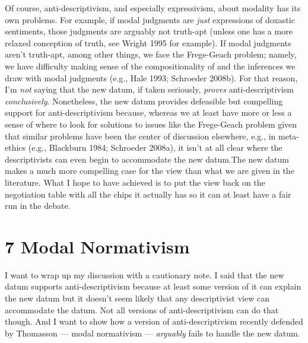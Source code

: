 \documentclass[a4paper,12pt]{article}
\begin{document}
Of course, anti-descriptivism, and especially expressivism, about modality has its own problems. For example, if modal judgments are \emph{just} expressions of doxastic sentiments, those judgments are arguably not truth-apt (unless one has a more relaxed conception of truth, see Wright 1995 for example). If modal judgments aren't truth-apt, among other things, we face the Frege-Geach problem; namely, we have difficulty making sense of the compositionality of and the inferences we draw with modal judgments (e.g., Hale 1993; Schroeder 2008b). For that reason, I'm \emph{not} saying that the new datum, if taken seriously, \emph{proves} anti-descriptivism \emph{conclusively}. Nonetheless, the new datum provides defeasible but compelling support for anti-descriptivism because, whereas we at least have more or less a sense of where to look for solutions to issues like the Frege-Geach problem given that similar problems have been the center of discussion elsewhere, e.g., in meta-ethics (e.g., Blackburn 1984; Schroeder 2008a), it isn't at all clear where the descriptivists can even begin to accommodate the new datum.\footnotemark The new datum makes a much more compelling case for the view than what we are given in the literature. What I hope to have achieved is to put the view back on the negotiation table with all the chips it actually has so it can at least have a fair run in the debate.


\section*{7 Modal Normativism}
I want to wrap up my discussion with a cautionary note. I said that the new datum supports anti-descriptivism because at least some version of it can explain the new datum but it doesn't seem likely that any descriptivist view can accommodate the datum. Not all versions of anti-descriptivism can do that though. And I want to show how a version of anti-descriptivism recently defended by Thomasson --- modal normativism --- \emph{arguably} fails to handle the new datum.
\end{document}
